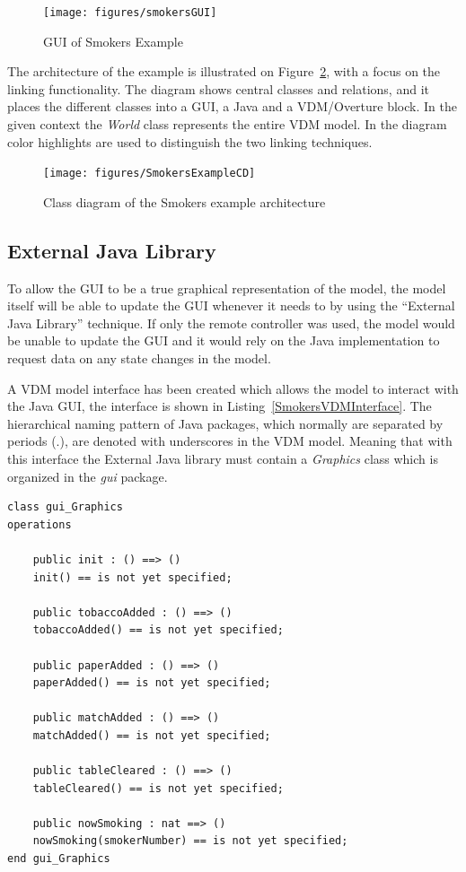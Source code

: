 \documentclass{overturerepchap}
\begin{document}
\begin{figure}[!h]
\begin{center}
  \texttt{[image: figures/smokersGUI]}
  \caption[labelInTOC]{GUI of Smokers Example}
  \label{fig:gui:SmokersGUI}
\end{center}
\end{figure}

The architecture of the example is illustrated on Figure~\ref{fig:gui:SmokersExampleCD}, with a focus on the  linking functionality. The diagram shows central classes and relations, and it places the different classes into a GUI, a Java and a VDM/Overture block. In the given context the \textit{World} class represents the entire VDM model. In the diagram color highlights are used to distinguish the two linking techniques.

\begin{figure}[!h]
\begin{center}
  \texttt{[image: figures/SmokersExampleCD]}
  \caption[labelInTOC]{Class diagram of the Smokers example architecture}
  \label{fig:gui:SmokersExampleCD}
\end{center}
\end{figure}

\subsection{External Java Library}
To allow the GUI to be a true graphical representation of the model, the model itself will be able to update the GUI whenever it needs to by using the ``External Java Library'' technique. If only the remote controller was used, the model would be unable to update the GUI and it would rely on the Java implementation to request data on any state changes in the model. 

A VDM model interface has been created which allows the model to interact with the Java GUI, the interface is shown in Listing~\ref{SmokersVDMInterface}. The hierarchical naming pattern of Java packages, which  normally are separated by periods (.), are denoted with underscores in the VDM model. Meaning that with this interface the External Java library must contain a  \textit{Graphics} class which is organized in the \textit{gui} package.

\begin{lstlisting}[language=VDM++,label=SmokersVDMInterface,caption=VDM interface for external Java library,captionpos=b]
class gui_Graphics
operations

    public init : () ==> ()
	init() == is not yet specified;

	public tobaccoAdded : () ==> ()
	tobaccoAdded() == is not yet specified;

	public paperAdded : () ==> ()
	paperAdded() == is not yet specified;

	public matchAdded : () ==> ()
	matchAdded() == is not yet specified;

	public tableCleared : () ==> ()
	tableCleared() == is not yet specified;

	public nowSmoking : nat ==> ()
	nowSmoking(smokerNumber) == is not yet specified;
end gui_Graphics
\end{lstlisting}
\end{document}
